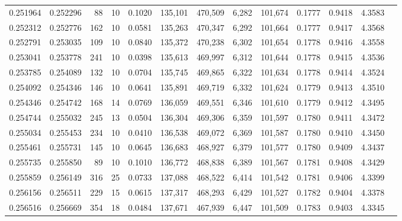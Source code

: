 \begin{tabular}{rrrrrrrrrrrrr}
0.251964 & 0.252296 &    88 &  10 &                                     0.1020 & 135,101 & 470,509 &   6,282 & 101,674 & 0.1777 & 0.9418 & 4.3583 \\
0.252312 & 0.252776 &   162 &  10 &                                     0.0581 & 135,263 & 470,347 &   6,292 & 101,664 & 0.1777 & 0.9417 & 4.3568 \\
0.252791 & 0.253035 &   109 &  10 &                                     0.0840 & 135,372 & 470,238 &   6,302 & 101,654 & 0.1778 & 0.9416 & 4.3558 \\
0.253041 & 0.253778 &   241 &  10 &                                     0.0398 & 135,613 & 469,997 &   6,312 & 101,644 & 0.1778 & 0.9415 & 4.3536 \\
0.253785 & 0.254089 &   132 &  10 &                                     0.0704 & 135,745 & 469,865 &   6,322 & 101,634 & 0.1778 & 0.9414 & 4.3524 \\
0.254092 & 0.254346 &   146 &  10 &                                     0.0641 & 135,891 & 469,719 &   6,332 & 101,624 & 0.1779 & 0.9413 & 4.3510 \\
0.254346 & 0.254742 &   168 &  14 &                                     0.0769 & 136,059 & 469,551 &   6,346 & 101,610 & 0.1779 & 0.9412 & 4.3495 \\
0.254744 & 0.255032 &   245 &  13 &                                     0.0504 & 136,304 & 469,306 &   6,359 & 101,597 & 0.1780 & 0.9411 & 4.3472 \\
0.255034 & 0.255453 &   234 &  10 &                                     0.0410 & 136,538 & 469,072 &   6,369 & 101,587 & 0.1780 & 0.9410 & 4.3450 \\
0.255461 & 0.255731 &   145 &  10 &                                     0.0645 & 136,683 & 468,927 &   6,379 & 101,577 & 0.1780 & 0.9409 & 4.3437 \\
0.255735 & 0.255850 &    89 &  10 &                                     0.1010 & 136,772 & 468,838 &   6,389 & 101,567 & 0.1781 & 0.9408 & 4.3429 \\
0.255859 & 0.256149 &   316 &  25 &                                     0.0733 & 137,088 & 468,522 &   6,414 & 101,542 & 0.1781 & 0.9406 & 4.3399 \\
0.256156 & 0.256511 &   229 &  15 &                                     0.0615 & 137,317 & 468,293 &   6,429 & 101,527 & 0.1782 & 0.9404 & 4.3378 \\
0.256516 & 0.256669 &   354 &  18 &                                     0.0484 & 137,671 & 467,939 &   6,447 & 101,509 & 0.1783 & 0.9403 & 4.3345 \\

\end{tabular}
